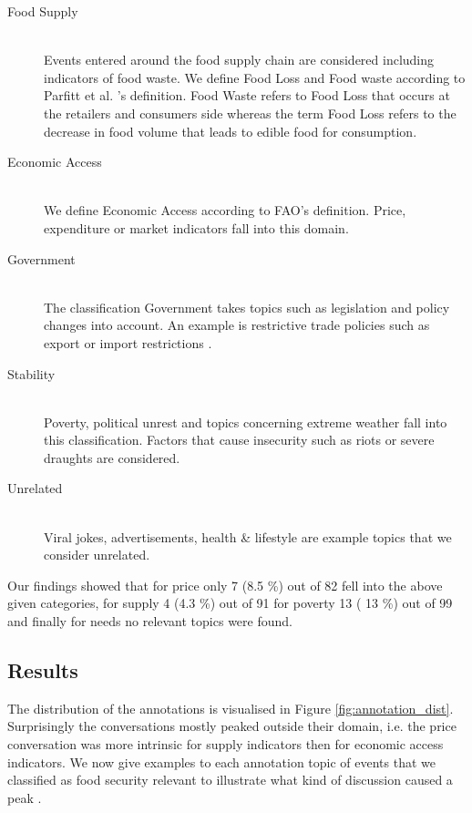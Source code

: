 \begin{description}
  \item[Food Supply ] \hfill \\
 Events entered around the food supply chain are considered including indicators of food waste. We define Food Loss and Food waste according to Parfitt et al. 's \cite{Julian10} definition. Food Waste refers to Food Loss that occurs at the retailers and consumers side whereas the term Food Loss refers to the decrease in food volume that leads to edible food for consumption.
  \item[Economic Access] \hfill \\
  We define Economic Access according to FAO's \cite{fao2008} definition. Price, expenditure or market indicators fall into this domain.   
  \item[Government] \hfill \\
  The classification Government takes topics such as legislation and policy changes into account. An example is restrictive trade policies such as export or import restrictions  \cite{Tadesse2014}. 
    \item[Stability] \hfill \\
 Poverty,  political unrest and topics concerning extreme weather \cite{fao2008} fall into this classification. Factors that cause insecurity such as riots or severe draughts are considered. 
    \item[Unrelated] \hfill \\
   Viral jokes,  advertisements, health \& lifestyle are example topics that we consider unrelated. 



\end{description}








Our findings showed that for price only 7 (8.5 \%) out of 82 fell into the above given categories, for  supply 4 (4.3 \%) out of 91 for poverty 13 ( 13 \%) out of 99 and finally for needs no relevant topics were found. 


\subsection{Results}
\label{an_result}

The distribution of the annotations is visualised in Figure \ref{fig:annotation_dist}. Surprisingly the conversations mostly peaked outside their domain, i.e. the price conversation was more intrinsic for supply indicators then for economic access indicators. We now give examples to each annotation topic of events that we classified as food security relevant to illustrate what kind of discussion caused a peak . 



